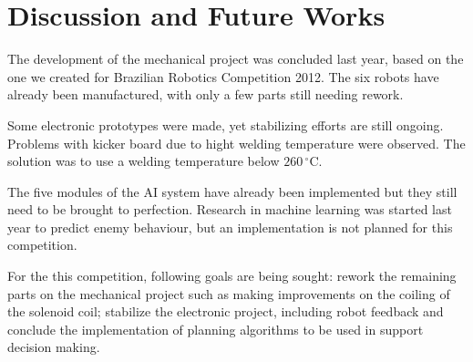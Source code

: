 \section{Discussion and Future Works}\label{dic_fut_sec}

The development of the mechanical project was concluded last year, based on the
one we created for Brazilian Robotics Competition 2012. The six robots have
already been manufactured, with only a few parts still needing rework.

Some electronic prototypes were made, yet stabilizing efforts are still
ongoing. Problems with kicker board due to hight welding temperature were
observed. The solution was to use a welding temperature below
$260\,^{\circ}\mathrm{C}$.

The five modules of the AI system have already been implemented but they still
need to be brought to perfection. Research in machine learning was started last
year to predict enemy behaviour, but an implementation is not planned for this
competition.

For the this competition, following goals are being sought: rework the
remaining parts on the mechanical project such as making improvements on the
coiling of the solenoid coil; stabilize the electronic project, including robot
feedback and conclude the implementation of planning algorithms to be used in
support decision making.

